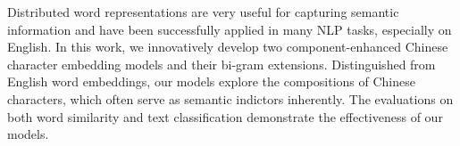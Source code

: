Distributed word representations are very useful for capturing semantic information and have been successfully applied in many NLP tasks, especially on English. In this work, we innovatively develop two component-enhanced Chinese character embedding models and their bi-gram extensions. Distinguished from English word embeddings, our models explore the compositions of Chinese characters, which often serve as semantic indictors inherently. The evaluations on both word similarity and text classification demonstrate the effectiveness of our models.
